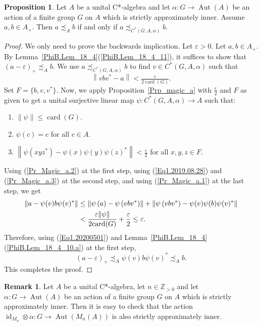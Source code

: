 \documentclass[10pt]{amsart}
\numberwithin{equation}{section}
\theoremstyle{definition}
\newtheorem{prp}[thm]{Proposition}
\newtheorem{rmk}[thm]{Remark}
\newcommand{\af}{\alpha}
\newcommand{\ep}{\varepsilon}
\newcommand{\N}{{\mathbb{Z}}_{> 0}}
\newcommand{\id}{{\operatorname{id}}}
\newcommand{\card}{{\operatorname{card}}}
\newcommand{\Aut}{{\operatorname{Aut}}}
\newcommand{\ca}{C*-algebra}
\newcommand{\CGAa}{C^* (G, A, \af)}
\newcommand{\Prp}[1]{Proposition~\ref{#1}}
\begin{document}
%
\begin{prp}\label{Pr_Magic_a}
Let $A$ be a unital \ca{} and let  $\alpha \colon  G \to \Aut(A)$ be an action of a 
finite  group $G$ on $A$ which is  strictly approximately inner. Assume $a, b \in A_+$.
Then $a \precsim_{A} b$ if and only if $a \precsim_{\CGAa} b$. 
\end{prp}
\begin{proof}
We only need to prove the backwards implication. Let $\ep> 0$. Let $a, b \in A_+$.
By Lemma~\ref{PhiB.Lem_18_4}(\ref{PhiB.Lem_18_4_11}), it suffices to show that
 $(a - \ep)_+ \precsim_{A} b$.
We use $a  \precsim_{C^*(G, A, \alpha)} b$  to find $v \in C^*(G, A, \alpha)$ such that 
\begin{equation}\label{Eq1.2019.08.28}
\left\| v b v^* - a \right\| < \tfrac{\ep}{2 \card (G)}.
\end{equation}
Set 
$F= \big\{b,  v, v^* \big\}$. 
Now, we apply \Prp{Prp_magic_a} with $\frac{\ep}{2}$ and $F$ as given to get a unital surjective linear map 
$\psi \colon \CGAa \to A $ such that:
\begin{enumerate}
\item \label{Pr_Magic_a.1}
$\| \psi \| \leq \card (G)$.
\item \label{Pr_Magic_a.2}
$\psi (c) = c$ for all $c \in A$.
\item \label{Pr_Magic_a.3}
$\left\| \psi (xy z^*) - \psi (x) \psi (y) \psi (z)^*\right\| < \frac{\ep}{2}$ for all $x, y, z \in F$.
\end{enumerate}
Using (\ref{Pr_Magic_a.2}) at the first step, 
using (\ref{Eq1.2019.08.28}) and (\ref{Pr_Magic_a.3}) at the second step, 
and using (\ref{Pr_Magic_a.1}) at the last step, we get
\begin{align}\label{Eq1.20200501}
\left\|a - \psi (v) b \psi (v)^* \right\|
&\leq
\left\| \psi \left(a\right) - \psi \left( v b v^*\right) \right\|
+
\left\| \psi \left( v b v^* \right) - \psi ( v ) \psi (b)  \psi ( v)^* \right\|
\\\notag
&<
  \frac{\ep \| \psi \|}{2 \card (G)}
+
\frac{\ep}{2} \leq \ep.
\end{align}
Therefore,  using (\ref{Eq1.20200501}) and 
Lemma~\ref{PhiB.Lem_18_4}(\ref{PhiB.Lem_18_4_10.a}) at the first step,
\[
(a - \ep)_+ \precsim_{A} \psi ( v ) b  \psi ( v)^*  \precsim_A b.
\]
This completes the proof.
\end{proof}
%
\begin{rmk}\label{Exten_Ap_in}
Let $A$ be a unital \ca, let $n \in \N$ and let  $\alpha \colon  G \to \Aut(A)$ be an action of a 
finite  group $G$ on $A$ which is  strictly approximately inner. 
Then it is easy to check that the action $\id_{M_n} \otimes \alpha \colon G \to \Aut (M_n (A))$
 is also strictly approximately inner.
\end{rmk}
\end{document}
